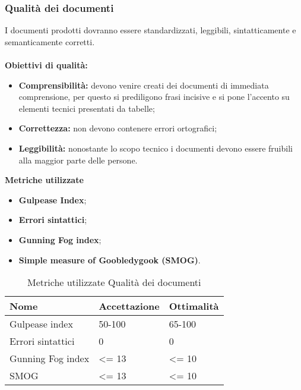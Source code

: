 \subsubsection{Qualità dei documenti}
I documenti prodotti dovranno essere standardizzati, leggibili, sintatticamente e semanticamente corretti.\\\\
\textbf{Obiettivi di qualità:}
\begin{itemize}
	\item{\textbf{Comprensibilità:} devono venire creati dei documenti di immediata comprensione, per questo si prediligono frasi incisive e si pone l'accento su elementi tecnici presentati da tabelle;}
	\item\textbf{Correttezza:} non devono contenere errori ortografici;
	\item\textbf{Leggibilità:} nonostante lo scopo tecnico i documenti devono essere fruibili alla maggior parte delle persone.\\
\end{itemize}
\textbf{Metriche utilizzate}
\begin{itemize}
	\item{\textbf{Gulpease Index\pedice};}
	\item{\textbf{Errori sintattici};}
	\item{\textbf{Gunning Fog index\pedice};}
	\item{\textbf{Simple measure of Goobledygook (SMOG)\pedice}.}
\end{itemize}
\begin{table}[!htpb]
	\centering
	\renewcommand{\arraystretch}{2} 
		\begin{tabular}{|l|l|l|}
			\rowcolor{orange!50}
			\hline
			\textbf{Nome} & \textbf{Accettazione} & \textbf{Ottimalità} \\ \hline
			Gulpease index    &   50-100   &    65-100       \\ \hline
			Errori sintattici     &  0    &   0      \\ \hline
			Gunning Fog index    &     \textless= 13      &   \textless= 10   \\ \hline
			SMOG                  &              \textless= 13                                &                         \textless= 10                   \\ \hline
		\end{tabular}
	\caption{Metriche utilizzate Qualità dei documenti}
\end{table}
\newpage
